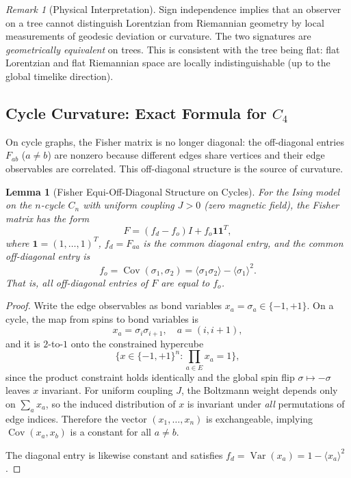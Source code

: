 \documentclass[11pt]{article}
\newtheorem{lemma}[theorem]{Lemma}
\theoremstyle{definition}
\theoremstyle{remark}
\newtheorem{remark}[theorem]{Remark}
\newcommand{\Fish}{F}
\newcommand{\Cov}{\operatorname{Cov}}
\newcommand{\Var}{\operatorname{Var}}
\newcommand{\edgeo}{\sigma}
\begin{document}
\begin{remark}[Physical Interpretation]
Sign independence implies that an observer on a tree cannot distinguish
Lorentzian from Riemannian geometry by local measurements of geodesic
deviation or curvature. The two signatures are \emph{geometrically
equivalent} on trees. This is consistent with the tree being flat: flat
Lorentzian and flat Riemannian space are locally indistinguishable (up
to the global timelike direction).
\end{remark}

\subsection{Cycle Curvature: Exact Formula for $C_4$}
\label{subsec:cycle-curvature}

On cycle graphs, the Fisher matrix is no longer diagonal: the off-diagonal
entries $\Fish_{ab}$ ($a \neq b$) are nonzero because different edges share
vertices and their edge observables are correlated. This off-diagonal
structure is the source of curvature.

\begin{lemma}[Fisher Equi-Off-Diagonal Structure on Cycles]
\label{lem:equi-off-diag}
For the Ising model on the $n$-cycle $C_n$ with uniform coupling
$J > 0$ (zero magnetic field), the Fisher matrix has the form
\begin{equation}
  \Fish = (f_d - f_o) I + f_o \mathbf{1}\mathbf{1}^T,
  \label{eq:fisher-cycle-structure}
\end{equation}
where $\mathbf{1} = (1, \ldots, 1)^T$, $f_d = \Fish_{aa}$ is the common
diagonal entry, and the common off-diagonal entry is
\begin{equation}
  f_o = \Cov(\edgeo_1, \edgeo_2)
  = \langle \edgeo_1 \edgeo_2 \rangle - \langle \edgeo_1 \rangle^2.
  \label{eq:fo-def}
\end{equation}
That is, \emph{all} off-diagonal entries of $\Fish$ are equal to $f_o$.
\end{lemma}

\begin{proof}
Write the edge observables as bond variables $x_a = \edgeo_a \in \{-1, +1\}$.
On a cycle, the map from spins to bond variables is
\[
  x_a = \sigma_i \sigma_{i+1}, \quad a = (i, i{+}1),
\]
and it is $2$-to-$1$ onto the constrained hypercube
\[
  \{x \in \{-1, +1\}^n : \prod_{a \in E} x_a = 1\},
\]
since the product constraint holds identically and the global spin flip
$\sigma \mapsto -\sigma$ leaves $x$ invariant.
For uniform coupling $J$, the Boltzmann weight depends only on
$\sum_a x_a$, so the induced distribution of $x$ is invariant under
\emph{all} permutations of edge indices. Therefore the vector
$(x_1, \ldots, x_n)$ is exchangeable, implying $\Cov(x_a, x_b)$ is a
constant for all $a \neq b$.

The diagonal entry is likewise constant and satisfies
$f_d = \Var(x_a) = 1 - \langle x_a \rangle^2$.
\end{proof}
\end{document}
